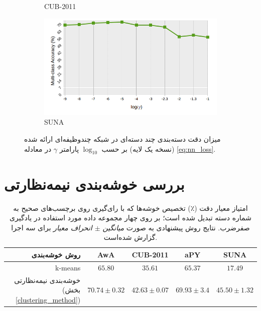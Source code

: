 \begin{figure}[!th]
\begin{subfigure}[b]{0.43\linewidth}
    \caption{CUB-2011}
\end{subfigure}
\begin{subfigure}[b]{0.43\linewidth}
    \includegraphics[width=\linewidth]{images/nn_param_sun}
    \caption{SUNA}
\end{subfigure}
\caption[نمودار تحلیل پارامتر شبکه عصبی]{
میزان دقت دسته‌بندی چند دسته‌ای در شبکه چندوظیفه‌ای ارائه شده (نسخه یک لایه) بر حسب $\log_{10}$ پارامتر $\gamma$ در معادله
\eqref{eq:nn_loss}.
}
\label{fig:nn_param}
\end{figure}




\section{بررسی خوشه‌بندی نیمه‌نظارتی}
\begin{table}[ht]
\centering
\caption[بررسی عمل‌کرد خوشه‌بندی نیمه‌نظارتی پیشنهاتی]{
امتیاز معیار دقت (٪) تخصیص خوشه‌ها که با رای‌گیری روی برچسب‌های صحیح به شماره دسته تبدیل شده است؛ بر روی چهار مجموعه داده مورد استفاده در یادگیری صفرضرب. نتایج روش پیشنهادی به صورت
\textit{ میانگین $\pm$ انحراف معیار }
برای سه اجرا گزارش شده‌است.}
\vspace*{2mm}
  \label{tab:clustering}
\begin{tabular}{|r|c|c|c|c|}
\hline
روش خوشه‌بندی & AwA & CUB-2011 & aPY & SUNA \\
\hline
k-means                             &  ${65.80}$                 & ${35.61}$           & ${65.37 }$               & ${17.49 }$   \\
\hline
خوشه‌بندی نیمه‌نظارتی (بخش \ref{clustering_method})
                      & \textbf{${70.74\pm 0.32}$}  & \textbf{${42.63\pm 0.07}$} & \textbf{${69.93\pm 3.4}$} & \textbf{ ${45.50 \pm 1.32}$} \\
\hline
\end{tabular}
\vspace{2mm}
\end{table}

